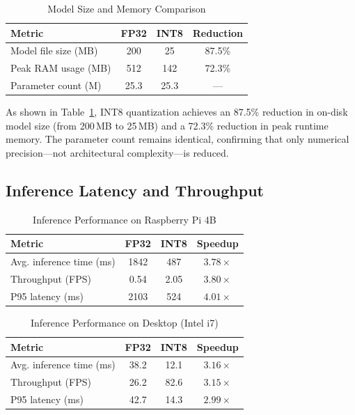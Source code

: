 \documentclass[conference]{IEEEtran}
\begin{document}
\begin{table}[htbp]
\caption{Model Size and Memory Comparison}
\label{tab:size}
\centering
\begin{tabular}{lccc}
\toprule
\textbf{Metric} & \textbf{FP32} & \textbf{INT8} & \textbf{Reduction} \\
\midrule
Model file size (MB) & 200 & 25 & 87.5\% \\
Peak RAM usage (MB)  & 512  & 142  & 72.3\% \\
Parameter count (M)  & 25.3  & 25.3 & --- \\
\bottomrule
\end{tabular}
\end{table}

As shown in Table~\ref{tab:size}, INT8 quantization achieves an 87.5\% reduction in on-disk model size (from 200\,MB to 25\,MB) and a 72.3\% reduction in peak runtime memory. The parameter count remains identical, confirming that only numerical precision---not architectural complexity---is reduced.

\subsection{Inference Latency and Throughput}

\begin{table}[htbp]
\caption{Inference Performance on Raspberry Pi 4B}
\label{tab:rpi}
\centering
\begin{tabular}{lccc}
\toprule
\textbf{Metric} & \textbf{FP32} & \textbf{INT8} & \textbf{Speedup} \\
\midrule
Avg. inference time (ms)  & 1842 & 487 & $3.78\times$ \\
Throughput (FPS)           & 0.54 & 2.05 & $3.80\times$ \\
P95 latency (ms)          & 2103 & 524 & $4.01\times$ \\
\bottomrule
\end{tabular}
\end{table}

\begin{table}[htbp]
\caption{Inference Performance on Desktop (Intel i7)}
\label{tab:desktop}
\centering
\begin{tabular}{lccc}
\toprule
\textbf{Metric} & \textbf{FP32} & \textbf{INT8} & \textbf{Speedup} \\
\midrule
Avg. inference time (ms)  & 38.2 & 12.1 & $3.16\times$ \\
Throughput (FPS)           & 26.2 & 82.6 & $3.15\times$ \\
P95 latency (ms)          & 42.7 & 14.3 & $2.99\times$ \\
\bottomrule
\end{tabular}
\end{table}
\end{document}
